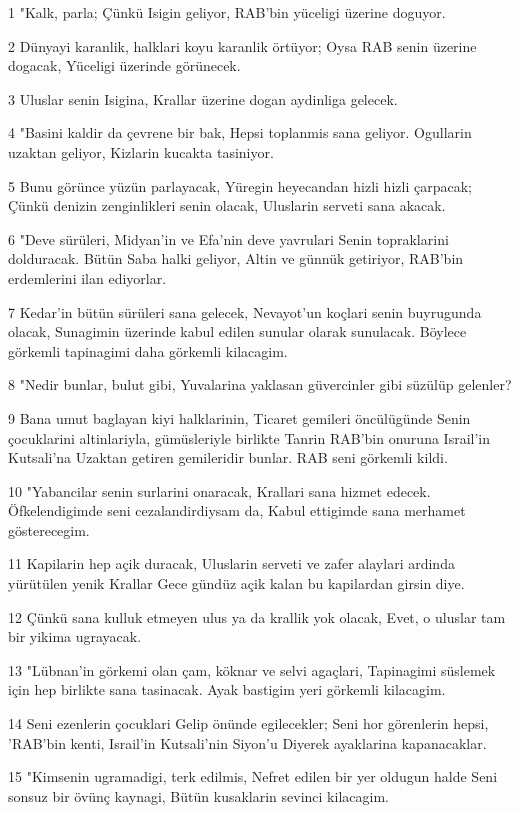 \par 1 "Kalk, parla; Çünkü Isigin geliyor, RAB'bin yüceligi üzerine doguyor.
\par 2 Dünyayi karanlik, halklari koyu karanlik örtüyor; Oysa RAB senin üzerine dogacak, Yüceligi üzerinde görünecek.
\par 3 Uluslar senin Isigina, Krallar üzerine dogan aydinliga gelecek.
\par 4 "Basini kaldir da çevrene bir bak, Hepsi toplanmis sana geliyor. Ogullarin uzaktan geliyor, Kizlarin kucakta tasiniyor.
\par 5 Bunu görünce yüzün parlayacak, Yüregin heyecandan hizli hizli çarpacak; Çünkü denizin zenginlikleri senin olacak, Uluslarin serveti sana akacak.
\par 6 "Deve sürüleri, Midyan'in ve Efa'nin deve yavrulari Senin topraklarini dolduracak. Bütün Saba halki geliyor, Altin ve günnük getiriyor, RAB'bin erdemlerini ilan ediyorlar.
\par 7 Kedar'in bütün sürüleri sana gelecek, Nevayot'un koçlari senin buyrugunda olacak, Sunagimin üzerinde kabul edilen sunular olarak sunulacak. Böylece görkemli tapinagimi daha görkemli kilacagim.
\par 8 "Nedir bunlar, bulut gibi, Yuvalarina yaklasan güvercinler gibi süzülüp gelenler?
\par 9 Bana umut baglayan kiyi halklarinin, Ticaret gemileri öncülügünde Senin çocuklarini altinlariyla, gümüsleriyle birlikte Tanrin RAB'bin onuruna Israil'in Kutsali'na Uzaktan getiren gemileridir bunlar. RAB seni görkemli kildi.
\par 10 "Yabancilar senin surlarini onaracak, Krallari sana hizmet edecek. Öfkelendigimde seni cezalandirdiysam da, Kabul ettigimde sana merhamet gösterecegim.
\par 11 Kapilarin hep açik duracak, Uluslarin serveti ve zafer alaylari ardinda yürütülen yenik Krallar Gece gündüz açik kalan bu kapilardan girsin diye.
\par 12 Çünkü sana kulluk etmeyen ulus ya da krallik yok olacak, Evet, o uluslar tam bir yikima ugrayacak.
\par 13 "Lübnan'in görkemi olan çam, köknar ve selvi agaçlari, Tapinagimi süslemek için hep birlikte sana tasinacak. Ayak bastigim yeri görkemli kilacagim.
\par 14 Seni ezenlerin çocuklari Gelip önünde egilecekler; Seni hor görenlerin hepsi, 'RAB'bin kenti, Israil'in Kutsali'nin Siyon'u Diyerek ayaklarina kapanacaklar.
\par 15 "Kimsenin ugramadigi, terk edilmis, Nefret edilen bir yer oldugun halde Seni sonsuz bir övünç kaynagi, Bütün kusaklarin sevinci kilacagim.
